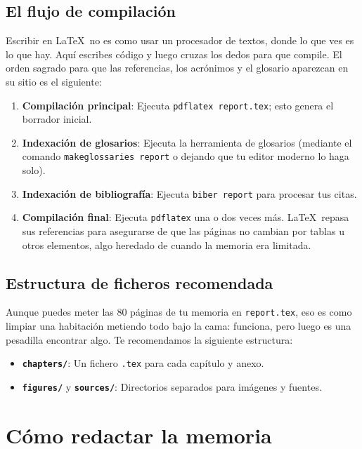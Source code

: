 \section{El flujo de compilación}

Escribir en \LaTeX\ no es como usar un procesador de textos, donde lo que ves es lo que hay. Aquí escribes código y luego cruzas los dedos para que compile. El orden sagrado para que las referencias, los acrónimos y el glosario aparezcan en su sitio es el siguiente:

\begin{enumerate}
    \item \textbf{Compilación principal}: Ejecuta \texttt{pdflatex report.tex}; esto genera el borrador inicial.
    \item \textbf{Indexación de glosarios}: Ejecuta la herramienta de glosarios (mediante el comando \texttt{makeglossaries report} o dejando que tu editor moderno lo haga solo).
    \item \textbf{Indexación de bibliografía}: Ejecuta \texttt{biber report} para procesar tus citas.
    \item \textbf{Compilación final}: Ejecuta \texttt{pdflatex} una o dos veces más. \LaTeX\ repasa sus referencias para asegurarse de que las páginas no cambian por tablas u otros elementos, algo heredado de cuando la memoria era limitada.
\end{enumerate}

\section{Estructura de ficheros recomendada}

Aunque puedes meter las 80 páginas de tu memoria en \texttt{report.tex}, eso es como limpiar una habitación metiendo todo bajo la cama: funciona, pero luego es una pesadilla encontrar algo. Te recomendamos la siguiente estructura:

\begin{itemize}
    \item \textbf{\texttt{chapters/}}: Un fichero \texttt{.tex} para cada capítulo y anexo.
    \item \textbf{\texttt{figures/}} y \textbf{\texttt{sources/}}: Directorios separados para imágenes y fuentes.
\end{itemize}

\chapter{Cómo redactar la memoria}
\label{ch:componentes-avanzados}

